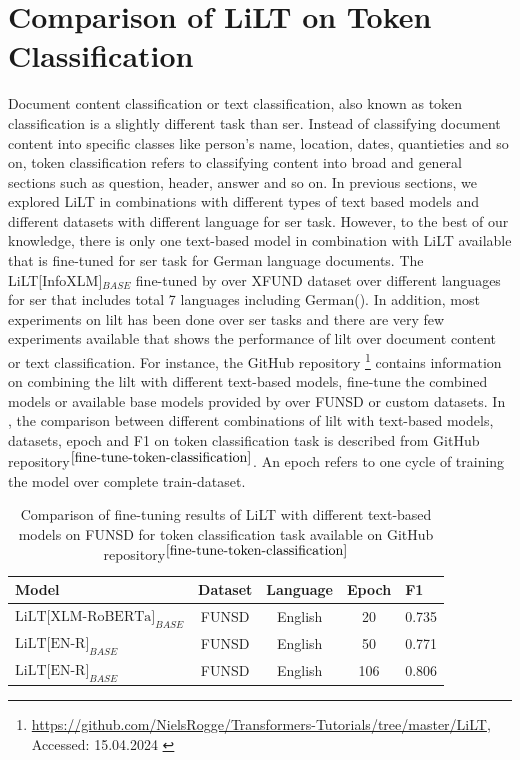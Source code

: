\section{Comparison of LiLT on Token Classification}
Document content classification or text classification, also known as token classification is a slightly different task than \acrshort{ser}. Instead of classifying document content into specific classes like person's name, location, dates, quantieties and so on, token classification refers to classifying content into broad and general sections such as question, header, answer and so on. In previous sections, we explored LiLT in combinations with different types of text based models and different datasets with different language for \acrshort{ser} task. However,  to the best of our knowledge, there is only one text-based model in combination with LiLT available that is fine-tuned for \acrshort{ser} task for German language documents. The LiLT[InfoXLM]\(_{BASE}\) fine-tuned by \cite{wang-etal-2022-lilt} over XFUND dataset over different languages for \acrshort{ser} that includes total 7 languages including German(). In addition, most experiments on \acrshort{lilt} has been done over \acrshort{ser} tasks and there are very few experiments available that shows the performance of \acrshort{lilt} over document content or text classification. For instance, the GitHub repository \footnote{\url{https://github.com/NielsRogge/Transformers-Tutorials/tree/master/LiLT}, Accessed: 15.04.2024 \label{fine-tune-token-classification}} contains information on combining the \acrshort{lilt} with different text-based models, fine-tune the combined models or available base models provided by \cite{wang-etal-2022-lilt} over FUNSD or custom datasets. In , the comparison between different combinations of \acrshort{lilt} with text-based models, datasets, epoch and F1 on token classification task is described from GitHub repository\(^{\ref{fine-tune-token-classification}}\). An epoch refers to one cycle of training the model over complete train-dataset. 

\begin{table}[!ht]
    \centering
    \captionsetup{justification=centering}
    \begin{tabular}{lcccl}
    \toprule
    \textbf{Model}& \textbf{Dataset}& \textbf{Language} & \textbf{Epoch} &\textbf{F1}\\ \midrule
     \(\text{LiLT[XLM-RoBERTa]}_{BASE}\)& FUNSD & English & 20 & 0.735 \\
     \(\text{LiLT[EN-R]}_{BASE}\) & FUNSD & English & 50 & 0.771 \\
     \(\text{LiLT[EN-R]}_{BASE}\)& FUNSD & English & 106 & 0.806 \\ \bottomrule
    \end{tabular}
    \caption{Comparison of fine-tuning results of LiLT with different text-based models  on FUNSD for token classification task available on GitHub repository\(^{\ref{fine-tune-token-classification}}\) }
    \label{tab:Compare_FUNSD_token_classification}
\end{table}


